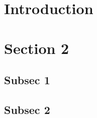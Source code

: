 \documentclass[11pt,a4paper,twoside,titlepage]{article}
\begin{document}
\section{Introduction}

\lipsum

\section{Section 2}
\lipsum
\subsection{Subsec 1 }
\lipsum
\subsection{Subsec 2}
\lipsum
\end{document}
